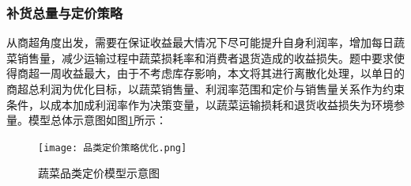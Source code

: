 \documentclass{my_paper}
\begin{document}
\subsubsection{补货总量与定价策略}
从商超角度出发，需要在保证收益最大情况下尽可能提升自身利润率，增加每日蔬菜销售量，减少运输过程中蔬菜损耗率和消费者退货造成的收益损失\cite{33}。题中要求使得商超一周收益最大，由于不考虑库存影响，本文将其进行离散化处理，以单日的商超总利润为优化目标，以蔬菜销售量、利润率范围和定价与销售量关系作为约束条件，以成本加成利润率作为决策变量，以蔬菜运输损耗和退货收益损失为环境参量。模型总体示意图如图\ref{蔬菜品类定价模型示意图}所示：
\begin{figure}[H]
 \centering
 \texttt{[image: 品类定价策略优化.png]}
 \caption{蔬菜品类定价模型示意图} %
 \label{蔬菜品类定价模型示意图} %
\end{figure}\par
\end{document}

